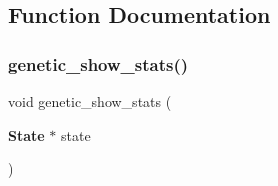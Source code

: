 \subsection{Function Documentation}
\mbox{\label{core_8c_a471131fbd6fb873da1e9e9e34866f35b}} 
\subsubsection{genetic\+\_\+show\+\_\+stats()}
{\footnotesize\ttfamily void genetic\+\_\+show\+\_\+stats (\begin{DoxyParamCaption}\item[{\textbf{ State} $\ast$}]{state }\end{DoxyParamCaption})}

